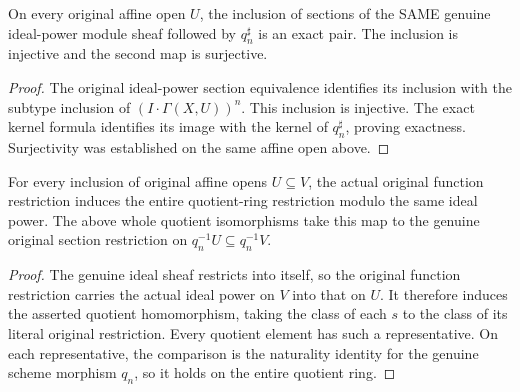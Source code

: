 \begin{lemma}
\label{lem:fibre-infinitesimal-affine-exact}
\leanok
On every original affine open $U$, the inclusion of sections of the
SAME genuine ideal-power module sheaf followed by $q_n^\sharp$ is an
exact pair. The inclusion is injective and the second map is surjective.
\end{lemma}
\begin{proof}
The original ideal-power section equivalence identifies its inclusion
with the subtype inclusion of $(I\cdot\Gamma(X,U))^n$. This inclusion
is injective. The exact kernel formula identifies its image with the
kernel of $q_n^\sharp$, proving exactness. Surjectivity was established
on the same affine open above.
\end{proof}

\begin{lemma}
\label{lem:fibre-infinitesimal-affine-restrictions}
\leanok
For every inclusion of original affine opens $U\subseteq V$, the actual
original function restriction induces the entire quotient-ring
restriction modulo the same ideal power. The above whole quotient
isomorphisms take this map to the genuine original section restriction
on $q_n^{-1}U\subseteq q_n^{-1}V$.
\end{lemma}
\begin{proof}
The genuine ideal sheaf restricts into itself, so the original function
restriction carries the actual ideal power on $V$ into that on $U$.
It therefore induces the asserted quotient homomorphism, taking the
class of each $s$ to the class of its literal original restriction.
Every quotient element has such a representative. On each representative,
the comparison is the naturality identity for the genuine scheme
morphism $q_n$, so it holds on the entire quotient ring.
\end{proof}
